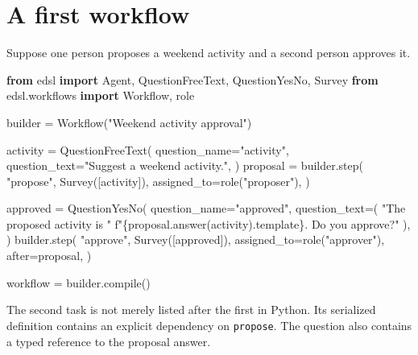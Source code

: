\documentclass[
  10pt,
]{report}
\newenvironment{Shaded}{}{}
\newcommand{\BuiltInTok}[1]{\textcolor[rgb]{0.00,0.50,0.00}{#1}}
\newcommand{\ImportTok}[1]{\textcolor[rgb]{0.00,0.50,0.00}{\textbf{#1}}}
\newcommand{\NormalTok}[1]{#1}
\newcommand{\OperatorTok}[1]{\textcolor[rgb]{0.40,0.40,0.40}{#1}}
\newcommand{\SpecialCharTok}[1]{\textcolor[rgb]{0.25,0.44,0.63}{#1}}
\newcommand{\SpecialStringTok}[1]{\textcolor[rgb]{0.73,0.40,0.53}{#1}}
\newcommand{\StringTok}[1]{\textcolor[rgb]{0.25,0.44,0.63}{#1}}
\begin{document}
\chapter{A first workflow}\label{a-first-workflow}

Suppose one person proposes a weekend activity and a second person
approves it.

\begin{Shaded}
\begin{Highlighting}[]
\ImportTok{from}\NormalTok{ edsl }\ImportTok{import}\NormalTok{ Agent, QuestionFreeText, QuestionYesNo, Survey}
\ImportTok{from}\NormalTok{ edsl.workflows }\ImportTok{import}\NormalTok{ Workflow, role}

\NormalTok{builder }\OperatorTok{=}\NormalTok{ Workflow(}\StringTok{"Weekend activity approval"}\NormalTok{)}

\NormalTok{activity }\OperatorTok{=}\NormalTok{ QuestionFreeText(}
\NormalTok{    question\_name}\OperatorTok{=}\StringTok{"activity"}\NormalTok{,}
\NormalTok{    question\_text}\OperatorTok{=}\StringTok{"Suggest a weekend activity."}\NormalTok{,}
\NormalTok{)}
\NormalTok{proposal }\OperatorTok{=}\NormalTok{ builder.step(}
    \StringTok{"propose"}\NormalTok{,}
\NormalTok{    Survey([activity]),}
\NormalTok{    assigned\_to}\OperatorTok{=}\NormalTok{role(}\StringTok{"proposer"}\NormalTok{),}
\NormalTok{)}

\NormalTok{approved }\OperatorTok{=}\NormalTok{ QuestionYesNo(}
\NormalTok{    question\_name}\OperatorTok{=}\StringTok{"approved"}\NormalTok{,}
\NormalTok{    question\_text}\OperatorTok{=}\NormalTok{(}
        \StringTok{"The proposed activity is "}
        \SpecialStringTok{f"}\SpecialCharTok{\{}\NormalTok{proposal}\SpecialCharTok{.}\NormalTok{answer(activity)}\SpecialCharTok{.}\NormalTok{template}\SpecialCharTok{\}}\SpecialStringTok{. Do you approve?"}
\NormalTok{    ),}
\NormalTok{)}
\NormalTok{builder.step(}
    \StringTok{"approve"}\NormalTok{,}
\NormalTok{    Survey([approved]),}
\NormalTok{    assigned\_to}\OperatorTok{=}\NormalTok{role(}\StringTok{"approver"}\NormalTok{),}
\NormalTok{    after}\OperatorTok{=}\NormalTok{proposal,}
\NormalTok{)}

\NormalTok{workflow }\OperatorTok{=}\NormalTok{ builder.}\BuiltInTok{compile}\NormalTok{()}
\end{Highlighting}
\end{Shaded}

The second task is not merely listed after the first in Python. Its
serialized definition contains an explicit dependency on
\texttt{propose}. The question also contains a typed reference to the
proposal answer.
\end{document}
